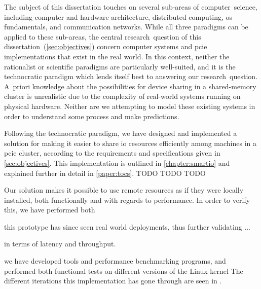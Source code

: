 The subject of this dissertation touches on several sub-areas of computer~science, including computer and hardware architecture, distributed computing, \gls{os} fundamentals, and communication networks.
%
While all three paradigms can be applied to these sub-areas, the central research~question of this dissertation~(\cref{sec:objectives}) concern computer systems and \gls{pcie} implementations that exist in the real world.
%
In this context, neither the rationalist or scientific paradigms are particularly well-suited, and it is the technocratic paradigm which lends itself best to answering our research~question.
%
A~priori knowledge about the possibilities for device sharing in a shared-memory cluster is unrealistic due to the complexity of real-world systems running on physical hardware.
%
Neither are we attempting to model these existing systems in order to understand some process and make predictions.



Following the technocratic paradigm, we have designed and implemented a solution for making it easier to share \gls{io} resources efficiently among machines in a \gls{pcie} cluster, according to the requirements and specifications given in \cref{sec:objectives}.
%
This implementation is outlined in \cref{chapter:smartio} and explained further in detail in \cref{paper:tocs}.
%
TODO TODO TODO


Our solution makes it possible to use remote resources as if they were locally installed, both functionally and with regards to performance.
%
In order to verify this, we have performed both 



this prototype has since seen real world deployments, thus further validating ...


in terms of latency and throughput.

we have developed tools and performance benchmarking programs, and performed both functional tests on different versions of the Linux kernel 
%
The different iterations this implementation has gone through are seen in .

%
%

